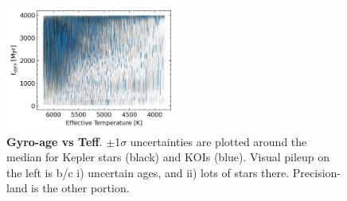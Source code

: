 \documentclass[11pt,twocolumn,tighten]{aastex63}
\begin{document}
\begin{figure}[!t]
	\begin{center}
		\leavevmode
		\includegraphics[width=0.5\textwidth]{gyroage_vs_teff_errs_showplanets_linear.png}
	\end{center}
	\vspace{-0.6cm}
	\caption{
		{\bf Gyro-age vs Teff}.
		$\pm$1$\sigma$ uncertainties are plotted around the median for Kepler stars (black) and KOIs (blue).
		Visual pileup on the left is b/c i) uncertain ages, and ii) lots of stars there.  Precision-land is the other portion.
		\label{fig:gyroage_vs_teff}
	}
\end{figure}

\clearpage
\listofchanges
\end{document}

